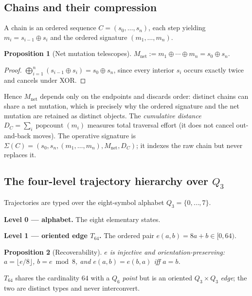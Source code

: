 \documentclass[11pt,a4paper]{article}
\newtheorem{proposition}{Proposition}
\begin{document}
\subsection{Chains and their compression}
A chain is an ordered sequence $C=(s_0,\dots,s_n)$, each step yielding
$m_i = s_{i-1}\oplus s_i$ and the ordered signature $(m_1,\dots,m_n)$.

\begin{proposition}[Net mutation telescopes]
$M_{\mathrm{net}} := m_1\oplus\cdots\oplus m_n = s_0 \oplus s_n.$
\end{proposition}
\begin{proof}
$\bigoplus_{i=1}^{n}(s_{i-1}\oplus s_i) = s_0\oplus s_n$, since every interior
$s_i$ occurs exactly twice and cancels under XOR. \end{proof}

Hence $M_{\mathrm{net}}$ depends only on the endpoints and discards order: distinct
chains can share a net mutation, which is precisely why the ordered signature and
the net mutation are retained as distinct objects. The \emph{cumulative distance}
$D_C = \sum_i \operatorname{popcount}(m_i)$ measures total traversal effort (it
does not cancel out-and-back moves). The operative signature is
$\Sigma(C) = (s_0, s_n, (m_1,\dots,m_n), M_{\mathrm{net}}, D_C)$; it indexes the raw
chain but never replaces it.

\subsection{The four-level trajectory hierarchy over \texorpdfstring{$Q_3$}{Q3}}
Trajectories are typed over the eight-symbol alphabet $Q_3=\{0,\dots,7\}$.

\textbf{Level 0 --- alphabet.} The eight elementary states.

\textbf{Level 1 --- oriented edge $T_{64}$.} The ordered pair $e(a,b)=8a+b\in[0,64)$.
\begin{proposition}[Recoverability]
$e$ is injective and orientation-preserving: $a=\lfloor e/8\rfloor$, $b=e\bmod 8$,
and $e(a,b)=e(b,a)$ iff $a=b$.
\end{proposition}
$T_{64}$ shares the cardinality $64$ with a $Q_6$ \emph{point} but is an oriented
$Q_3\times Q_3$ \emph{edge}; the two are distinct types and never interconvert.
\end{document}
